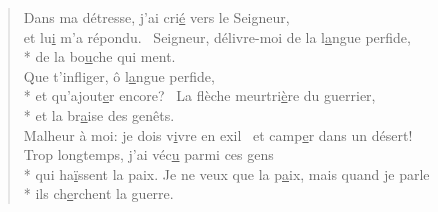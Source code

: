 \begin{verse}

Dans ma détresse, j’ai cri\underline{é} vers le Seigneur, \\
et lu\underline{i} m’a répondu.~\psalmstar
{}Seigneur, délivre-moi de la l\underline{a}ngue perfide, \\*
de la bo\underline{u}che qui ment. \\

Que t’infliger, ô l\underline{a}ngue perfide, \\*
et qu’ajout\underline{e}r encore?~\psalmstar
{}La flèche meurtri\underline{è}re du guerrier, \\*
et la br\underline{a}ise des genêts. \\

Malheur à moi: je dois v\underline{i}vre en exil~\psalmstar
et camp\underline{e}r dans un désert! \\

Trop longtemps, j’ai véc\underline{u} parmi ces gens \\*
qui ha\underline{ï}ssent la paix.\psalmstar
{}Je ne veux que la p\underline{a}ix, mais quand je parle \\*
ils ch\underline{e}rchent la guerre. \\
\end{verse}


